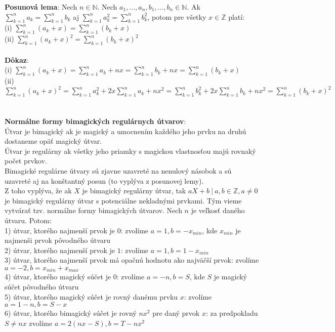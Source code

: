 \documentclass[12pt]{article}
\begin{document}
\textbf{Posunová lema}: Nech $n \in \mathbb{N}$. Nech $a_1, ... , a_n, b_1, ... , b_n \in \mathbb{N}$. Ak $\sum_{k=1}^{n} a_k = \sum_{k=1}^{n} b_k$ aj $\sum_{k=1}^{n} a^2_k = \sum_{k=1}^{n} b^2_k$, potom pre všetky $x \in \mathbb{Z}$ platí: \\
(i) $\sum_{k=1}^{n} (a_k + x) = \sum_{k=1}^{n} (b_k + x)$ \\
(ii) $\sum_{k=1}^{n} (a_k + x)^2 = \sum_{k=1}^{n} (b_k + x)^2$ \\\\
 
\textbf{Dôkaz}: \\
(i) $\sum_{k=1}^{n} (a_k + x) = \sum_{k=1}^{n} a_k + nx = \sum_{k=1}^{n} b_k + nx = \sum_{k=1}^{n} (b_k + x)$ \\
(ii) $\sum_{k=1}^{n} (a_k + x)^2 = \sum_{k=1}^{n} a^2_k + 2x \sum_{k=1}^{n} a_k + nx^2 = \sum_{k=1}^{n} b^2_k + 2x \sum_{k=1}^{n} b_k + nx^2 = \sum_{k=1}^{n} (b_k + x)^2$ \\\\\\

\textbf{Normálne formy bimagických regulárnych útvarov}: \\

Útvar je bimagický ak je magický a umocnením každého jeho prvku na druhú dostaneme opäť magický útvar. \\

Útvar je regulárny ak všetky jeho priamky s magickou vlastnosťou majú rovnaký počet prvkov. \\

Bimagické regulárne útvary sú zjavne uzavreté na nenulový násobok a sú uzavreté aj na konštantný posun (to vyplýva z posunovej lemy). \\

Z toho vyplýva, že ak $X$ je bimagický regulárny útvar, tak $aX+b ~|~ a,b \in \mathbb{Z}, a \neq 0$ je bimagický regulárny útvar s potenciálne nekladnými prvkami. Tým vieme vytvárať tzv. normálne formy bimagických útvarov. Nech $n$ je veľkosť daného útvaru. Potom: \\
1) útvar, ktorého najmenší prvok je $0$: zvolíme $a = 1, b = - x_{min}$, kde $x_{min}$ je najmenši prvok pôvodného útvaru \\
2) útvar, ktorého najmenší prvok je $1$: zvolíme $a = 1, b = 1 - x_{min}$ \\
3) útvar, ktorého najmenší prvok má opačnú hodnotu ako najväčší prvok: zvolíme $a = -2, b = x_{min} + x_{max}$ \\
4) útvar, ktorého magický súčet je $0$: zvolíme $a = -n, b = S$, kde $S$ je magický súčet pôvodného útvaru \\
5) útvar, ktorého magický súčet je rovný danému prvku $x$: zvolíme $a = 1-n, b = S-x$ \\
6) útvar, ktorého bimagický súčet je rovný $nx^2$ pre daný prvok $x$: za predpokladu $S \neq nx$ zvolíme $a = 2(nx - S), b = T - nx^2$ \\\\
\end{document}
